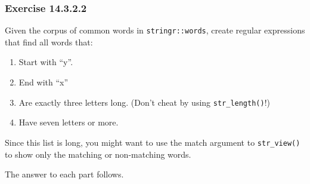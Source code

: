 \documentclass[]{book}
\providecommand{\tightlist}{%
  \setlength{\itemsep}{0pt}\setlength{\parskip}{0pt}}
\theoremstyle{plain}
\theoremstyle{remark}
\begin{document}
\hypertarget{exercise-14.3.2.2}{%
\subsubsection*{\texorpdfstring{Exercise
{14.3.2.2}}{Exercise 14.3.2.2}}\label{exercise-14.3.2.2}}

Given the corpus of common words in \texttt{stringr::words}, create
regular expressions that find all words that:

\begin{enumerate}
\def\labelenumi{\arabic{enumi}.}
\tightlist
\item
  Start with ``y''.
\item
  End with ``x''
\item
  Are exactly three letters long. (Don't cheat by using
  \texttt{str\_length()}!)
\item
  Have seven letters or more.
\end{enumerate}

Since this list is long, you might want to use the match argument to
\texttt{str\_view()} to show only the matching or non-matching words.

The answer to each part follows.
\end{document}
